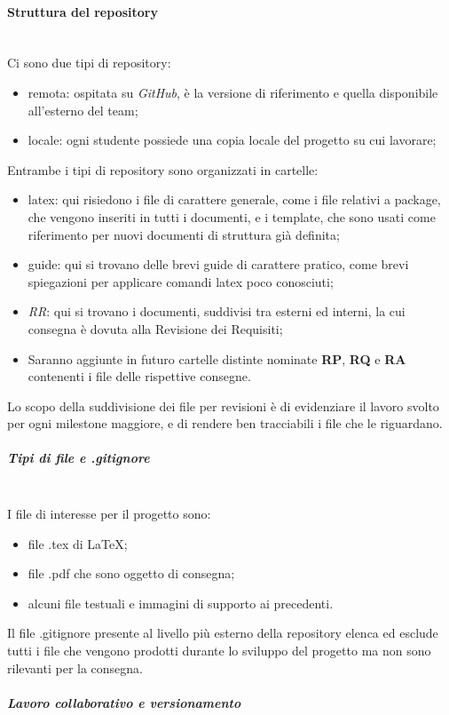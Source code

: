 	\paragraph{Struttura del repository} \mbox{}\\
	Ci sono due tipi di repository:
	\begin{itemize}
		\item remota: ospitata su \textit{GitHub}, è la versione di riferimento e quella disponibile all'esterno del team;
		\item locale: ogni studente possiede una copia locale del progetto su cui lavorare;
	\end{itemize}						
	Entrambe i tipi di repository sono organizzati in cartelle:
	\begin{itemize}
		\item latex: qui risiedono i file di carattere generale, come i file relativi a package, che vengono inseriti in tutti i documenti, e i template, che sono usati come riferimento per nuovi documenti di struttura già definita;
		\item guide: qui si trovano delle brevi guide di carattere pratico, come brevi spiegazioni per applicare comandi latex poco conosciuti;
		\item \textit{RR}: qui si trovano i documenti, suddivisi tra esterni ed interni, la cui consegna è dovuta alla Revisione dei Requisiti;
		\item Saranno aggiunte in futuro cartelle distinte nominate \textbf{RP}, \textbf{RQ} e \textbf{RA} contenenti i file delle rispettive consegne.
	\end{itemize}
	Lo scopo della suddivisione dei file per revisioni è di evidenziare il lavoro svolto per ogni milestone maggiore, e di rendere ben tracciabili i file che le riguardano.
	\subparagraph{Tipi di file e .gitignore} \mbox{}\\
	I file di interesse per il progetto sono:
	\begin{itemize}
		\item file .tex di \LaTeX{};
		\item file .pdf che sono oggetto di consegna;
		\item alcuni file testuali e immagini di supporto ai precedenti.
	\end{itemize}			
	Il file .gitignore presente al livello più esterno della repository elenca ed esclude tutti i file che vengono prodotti durante lo sviluppo del progetto ma non sono rilevanti per la consegna.
	\subparagraph{Lavoro collaborativo e versionamento} \mbox{}\\
